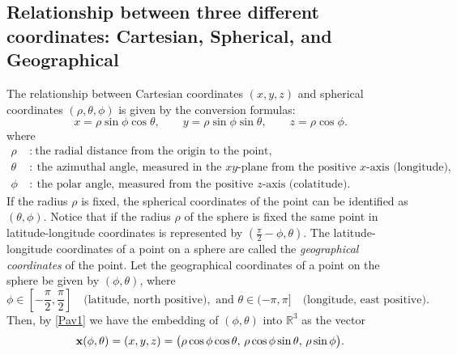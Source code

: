 \documentclass[12pt, reqno]{amsart}
\theoremstyle{plain}
\theoremstyle{definition}
\newcommand{\gq}{\theta}
\newcommand{\tbf}{\textbf}%
\newcommand{\tit}{\textit}%
\newcommand{\te}{\text}%
\begin{document}
 \subsection{Relationship between three different coordinates: Cartesian, Spherical, and Geographical} 
The relationship between Cartesian coordinates \((x, y, z)\) and spherical coordinates \((\rho, \theta, \phi)\) is given by the conversion formulas:
\begin{equation} \label{Pav1} 
x = \rho \sin \phi \cos \theta, \qquad
y = \rho \sin \phi \sin \theta, \qquad
z = \rho \cos \phi.
\end{equation} 
where 
\[
\begin{aligned}
\rho \ & : \ \text{the radial distance from the origin to the point,} \\
\theta \ & : \ \text{the azimuthal angle, measured in the } xy\text{-plane from the positive } x\text{-axis (longitude),} \\
\phi \ & : \ \text{the polar angle, measured from the positive } z\text{-axis (colatitude).}
\end{aligned}
\]
If the radius $\rho$ is fixed, the spherical coordinates of the point can be identified as $(\gq, \phi)$. Notice that if the radius $\rho$ of the sphere is fixed the same point in latitude-longitude coordinates is represented by $(\frac \pi 2-\phi, \gq)$. The latitude-longitude coordinates of a point on a sphere are called the \tit{geographical coordinates} of the point.  
Let the geographical coordinates of a point on the sphere be given by $(\phi, \gq)$, where 
\[
\phi \in \left[-\frac{\pi}{2}, \frac{\pi}{2}\right] \quad \text{(latitude, north positive)}, \te{ and }
\gq \in (-\pi, \pi] \quad \text{(longitude, east positive)}.
\]
Then, by \eqref{Pav1} we have the embedding of $(\phi, \gq)$ into $\mathbb{R}^3$ as the vector
\begin{equation} \label{Pav2}
\tbf x(\phi, \gq) = (x, y, z) = 
\bigl( \rho \cos \phi \cos \gq,\, \rho \cos \phi \sin \gq,\, \rho \sin \phi \bigr).
\end{equation} 
\end{document}
